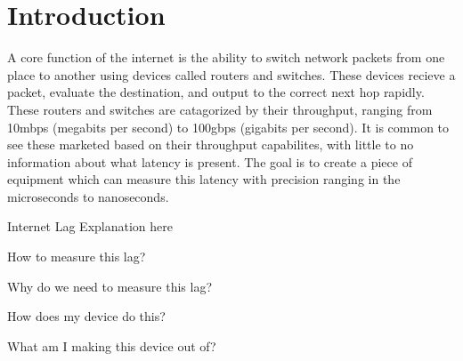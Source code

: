 \chapter{Introduction}\label{C:intro}

\par
A core function of the internet is the ability to switch network packets from one place to another using devices called routers and switches.
These devices recieve a packet, evaluate the destination, and output to the correct next hop rapidly.
These routers and switches are catagorized by their throughput, ranging from 10mbps (megabits per second) to 100gbps (gigabits per second).
It is common to see these marketed based on their throughput capabilites, with little to no information about what latency is present.
The goal is to create a piece of equipment which can measure this latency with precision ranging in the microseconds to nanoseconds.

\par Internet Lag Explanation here

\par How to measure this lag?

\par Why do we need to measure this lag?

\par How does my device do this?

\par What am I making this device out of?
